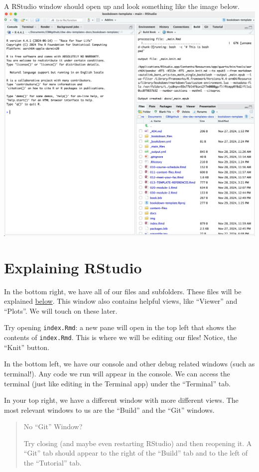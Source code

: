 \documentclass[
]{book}
\theoremstyle{definition}
\theoremstyle{definition}
\theoremstyle{definition}
\theoremstyle{definition}
\theoremstyle{remark}
\begin{document}
A RStudio window should open up and look something like the image below.
\includegraphics{img/files-and-build/newly-opened-RStudio.png}\\

\section{Explaining RStudio}\label{explaining-rstudio}

In the bottom right, we have all of our files and subfolders. These files will be explained \hyperref[file-setup]{below}. This window also contains helpful views, like ``Viewer'' and ``Plots''. We will touch on these later.

Try opening \texttt{index.Rmd}: a new pane will open in the top left that shows the contents of \texttt{index.Rmd}. This is where we will be editing our files! Notice, the ``Knit'' button.

In the bottom left, we have our console and other debug related windows (such as terminal!). Any code we run will appear in the console. We can access the terminal (just like editing in the Terminal app) under the ``Terminal'' tab.

In your top right, we have a different window with more different views. The most relevant windows to us are the ``Build'' and the ``Git'' windows.

\begin{quote}
No ``Git'' Window?

Try closing (and maybe even restarting RStudio) and then reopening it. A ``Git'' tab should appear to the right of the ``Build'' tab and to the left of the ``Tutorial'' tab.
\end{quote}
\end{document}
